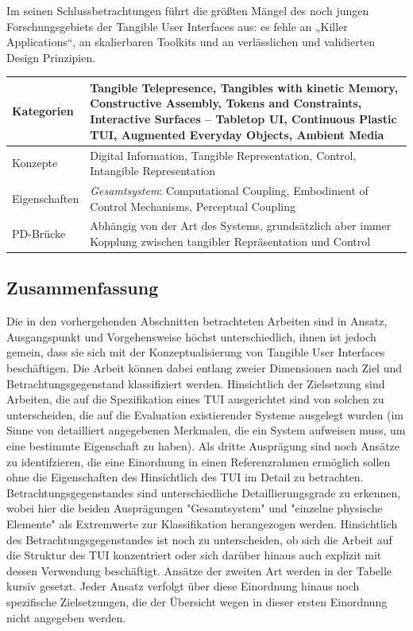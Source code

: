 Im seinen Schlussbetrachtungen führt \citeauthor{Ishii08} die größten Mängel des noch jungen Forschungsgebiets der Tangible User Interfaces aus: es fehle an „Killer Applications“, an skalierbaren Toolkits und an verlässlichen und validierten Design Prinzipien.

\begin{tabular}{| p{3cm} | p{10cm} |}
  \hline
  Kategorien & Tangible Telepresence, Tangibles with kinetic Memory, Constructive Assembly, Tokens and Constraints, Interactive Surfaces -- Tabletop UI, Continuous Plastic TUI, Augmented Everyday Objects, Ambient Media \\ \hline
  Konzepte & Digital Information, Tangible Representation, Control, Intangible Representation \\ \hline
  Eigenschaften & \emph{Gesamtsystem}: Computational Coupling, Embodiment of Control Mechanisms, Perceptual Coupling \\ \hline
  PD-Brücke & Abhängig von der Art des Systems, grundsätzlich aber immer Kopplung zwischen tangibler Repräsentation und Control \\ \hline
\end{tabular} 


\subsection{Zusammenfassung} %
\label{sub:tui_konzepte_zusammenfassung}

Die in den vorhergehenden Abschnitten betrachteten Arbeiten sind in Ansatz, Ausgangspunkt und Vorgehensweise höchst unterschiedlich, ihnen ist jedoch gemein, dass sie sich mit der Konzeptualisierung von Tangible User Interfaces beschäftigen. Die Arbeit können dabei entlang zweier Dimensionen nach Ziel und Betrachtungsgegenstand klassifiziert werden. Hinsichtlich der Zielsetzung sind Arbeiten, die auf die Spezifikation eines \gls{TUI} ausgerichtet sind von solchen zu unterscheiden, die auf die Evaluation existierender Systeme ausgelegt wurden (im Sinne von detailliert angegebenen Merkmalen, die ein System aufweisen muss, um eine bestimmte Eigenschaft zu haben). Als dritte Ausprägung sind noch Ansätze zu identifzieren, die eine Einordnung in einen Referenzrahmen ermöglich sollen ohne die Eigenschaften des Hinsichtlich des \gls{TUI} im Detail zu betrachten. Betrachtungsgegenstandes sind unterschiedliche Detaillierungsgrade zu erkennen, wobei hier die beiden Ausprägungen "Gesamtsystem" und "einzelne physische Elemente" als Extremwerte zur Klassifikation herangezogen werden. Hinsichtlich des Betrachtungsgegenstandes ist noch zu unterscheiden, ob sich die Arbeit auf die Struktur des \gls{TUI} konzentriert oder sich darüber hinaus auch explizit mit dessen Verwendung beschäftigt. Ansätze der zweiten Art werden in der Tabelle kursiv gesetzt. Jeder Ansatz verfolgt über diese Einordnung hinaus noch spezifische Zielsetzungen, die der Übersicht wegen in dieser ersten Einordnung nicht angegeben werden. 

